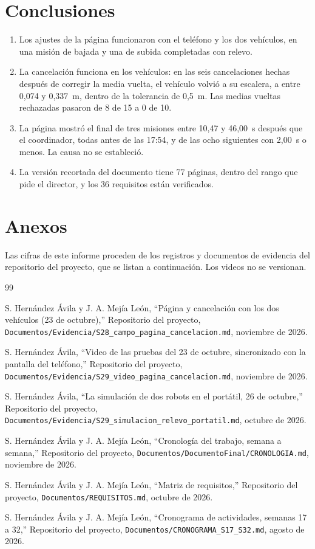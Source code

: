 \documentclass[12pt,letterpaper]{article}
\begin{document}
\section{Conclusiones}

\begin{enumerate}
    \item Los ajustes de la página funcionaron con el teléfono y los dos vehículos, en una misión de bajada y una de subida completadas con relevo.
    \item La cancelación funciona en los vehículos: en las seis cancelaciones hechas después de corregir la media vuelta, el vehículo volvió a su escalera, a entre 0,074 y 0,337~m, dentro de la tolerancia de 0,5~m. Las medias vueltas rechazadas pasaron de 8 de 15 a 0 de 10.
    \item La página mostró el final de tres misiones entre 10,47 y 46,00~s después que el coordinador, todas antes de las 17:54, y de las ocho siguientes con 2,00~s o menos. La causa no se estableció.
    \item La versión recortada del documento tiene 77 páginas, dentro del rango que pide el director, y los 36 requisitos están verificados.
\end{enumerate}

\section{Anexos}

Las cifras de este informe proceden de los registros y documentos de evidencia del repositorio del proyecto, que se listan a continuación. Los videos no se versionan.

\begin{thebibliography}{99}

S. Hernández Ávila y J. A. Mejía León,
``Página y cancelación con los dos vehículos (23 de octubre),''
Repositorio del proyecto, \texttt{Documentos/Evidencia/S28\_campo\_pagina\_cancelacion.md}, noviembre de 2026.

S. Hernández Ávila,
``Video de las pruebas del 23 de octubre, sincronizado con la pantalla del teléfono,''
Repositorio del proyecto, \texttt{Documentos/Evidencia/S29\_video\_pagina\_cancelacion.md}, noviembre de 2026.

S. Hernández Ávila,
``La simulación de dos robots en el portátil, 26 de octubre,''
Repositorio del proyecto, \texttt{Documentos/Evidencia/S29\_simulacion\_relevo\_portatil.md}, octubre de 2026.

S. Hernández Ávila y J. A. Mejía León,
``Cronología del trabajo, semana a semana,''
Repositorio del proyecto, \texttt{Documentos/DocumentoFinal/CRONOLOGIA.md}, noviembre de 2026.

S. Hernández Ávila y J. A. Mejía León,
``Matriz de requisitos,''
Repositorio del proyecto, \texttt{Documentos/REQUISITOS.md}, octubre de 2026.

S. Hernández Ávila y J. A. Mejía León,
``Cronograma de actividades, semanas 17 a 32,''
Repositorio del proyecto, \texttt{Documentos/CRONOGRAMA\_S17\_S32.md}, agosto de 2026.

\end{thebibliography}
\end{document}
